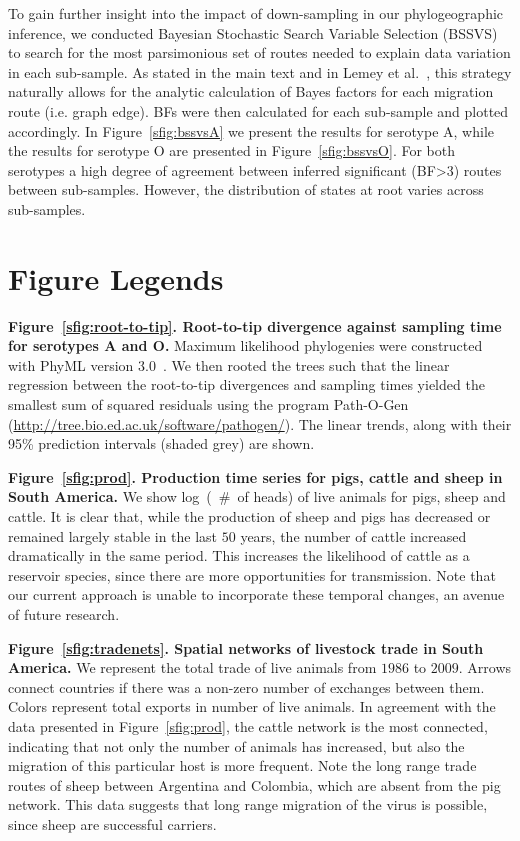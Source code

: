 \documentclass[a4paper,10pt]{article}
\begin{document}
To gain further insight into the impact of down-sampling in our phylogeographic inference, we conducted Bayesian Stochastic Search Variable Selection (BSSVS) to search for the most parsimonious set of routes needed to explain data variation in each sub-sample.
As stated in the main text and in Lemey et al.~\cite{M-roots}, this strategy naturally allows for the analytic calculation of Bayes factors for each migration route (i.e. graph edge).
BFs were then calculated for each sub-sample and plotted accordingly.
In Figure~\ref{sfig:bssvsA} we present the results for serotype A, while the results for serotype O are presented in Figure~\ref{sfig:bssvsO}.
For both serotypes a high degree of agreement between inferred significant (BF>3) routes between sub-samples.
However, the distribution of states at root varies across sub-samples.




\section*{Figure Legends}

\textbf{Figure~\ref{sfig:root-to-tip}. Root-to-tip divergence against sampling time for serotypes A and O.}
Maximum likelihood phylogenies were constructed with PhyML version 3.0~\cite{M-phyml}. 
We then rooted the trees such that the linear regression between the root-to-tip divergences and sampling times yielded the smallest sum of squared residuals using the program Path-O-Gen (\url{http://tree.bio.ed.ac.uk/software/pathogen/}).
The linear trends, along with their 95\% prediction intervals (shaded grey) are shown.

\textbf{Figure~\ref{sfig:prod}. Production time series for pigs, cattle and sheep in South America.}
We show log~(~\#~of heads) of live animals for pigs, sheep and cattle.
It is clear that, while the production of sheep and pigs has decreased or remained largely stable in the last $50$ years, the number of cattle increased dramatically in the same period.
This increases the likelihood of cattle as a reservoir species, since there are more opportunities for transmission.
Note that our current approach is unable to incorporate these temporal changes, an avenue of future research.

\textbf{Figure~\ref{sfig:tradenets}. Spatial networks of livestock trade in South America.}
We represent the total trade of live animals from $1986$ to $2009$.
Arrows connect countries if there was a non-zero number of exchanges between them.
Colors represent total exports in number of live animals.
In agreement with the data presented in Figure~\ref{sfig:prod}, the cattle network is the most connected, indicating that not only the number of animals has increased, but also the migration of this particular host is more frequent. 
Note the long range trade routes of sheep between Argentina and Colombia, which are absent from the pig network.
This data suggests that long range migration of the virus is possible, since sheep are successful carriers.
\end{document}
